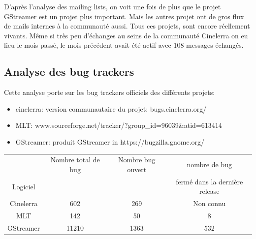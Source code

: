D'après l'analyse des mailing lists, on voit une fois de plus que le
projet GStreamer est un projet plus important. Mais les autres projet
ont de gros flux de mails internes à la communauté aussi. Tous ces
projets, sont encore réellement vivants. Même si très peu d'échanges
au seins de la communauté Cinelerra on eu lieu le mois passé, le mois
précédent avait été actif avec 108 messages échangés.

\subsection {Analyse des bug trackers}

Cette analyse porte sur les bug trackers officiels des différents
projets:

\begin{itemize}

  \item {cinelerra: version communautaire du projet:
    bugs.cinelerra.org/}

  \item {MLT:
  www.sourceforge.net/tracker/?group\_id=96039\&atid=613414}

  \item {GStreamer: produit GStreamer in https://bugzilla.gnome.org/}

\end{itemize}


\begin{center}

  \begin{tabular}{ | c | c | c | c|}

    \hline

         & Nombre total de bug & Nombre bug ouvert & nombre de bug \\

Logiciel &        & & fermé dans la dernière release \\

\hline \hline

Cinelerra & 602 & 269 & Non connu \\

\hline

MLT\index{MLT} & 142 & 50 & 8 \\

\hline

GStreamer & 11210 & 1363 &  532\\

\hline

  \end{tabular}

\end{center}

